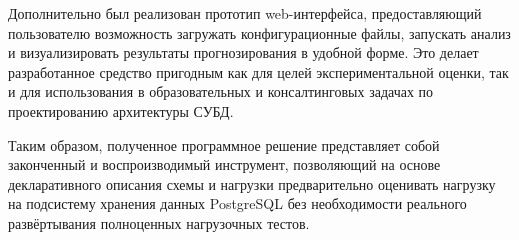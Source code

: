 Дополнительно был реализован прототип web-интерфейса, предоставляющий пользователю возможность загружать конфигурационные файлы, запускать анализ и визуализировать результаты прогнозирования в удобной форме. Это делает разработанное средство пригодным как для целей экспериментальной оценки, так и для использования в образовательных и консалтинговых задачах по проектированию архитектуры СУБД.

Таким образом, полученное программное решение представляет собой законченный и воспроизводимый инструмент, позволяющий на основе декларативного описания схемы и нагрузки предварительно оценивать нагрузку на подсистему хранения данных PostgreSQL без необходимости реального развёртывания полноценных нагрузочных тестов.

